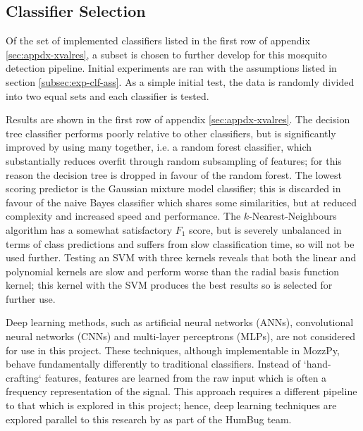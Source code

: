      
    \subsection{Classifier Selection}
    \label{subsec:exp-clf-select}
        Of the set of implemented classifiers listed in the first row of appendix \ref{sec:appdx-xvalres}, a subset is chosen to further develop for this mosquito detection pipeline. Initial experiments are ran with the assumptions listed in section \ref{subsec:exp-clf-ass}. As a simple initial test, the data is randomly divided into two equal sets and each classifier is tested.
        
        Results are shown in the first row of appendix \ref{sec:appdx-xvalres}. The decision tree classifier performs poorly relative to other classifiers, but is significantly improved by using many together, i.e. a random forest classifier, which substantially reduces overfit through random subsampling of features; for this reason the decision tree is dropped in favour of the random forest. The lowest scoring predictor is the Gaussian mixture model classifier; this is discarded in favour of the naive Bayes classifier which shares some similarities, but at reduced complexity and increased speed and performance. The $k$-Nearest-Neighbours algorithm has a somewhat satisfactory $F_1$ score, but is severely unbalanced in terms of class predictions and suffers from slow classification time, so will not be used further. Testing an SVM with three kernels reveals that both the linear and polynomial kernels are slow and perform worse than the radial basis function kernel; this kernel with the SVM produces the best results so is selected for further use.

        Deep learning methods, such as artificial neural networks (ANNs), convolutional neural networks (CNNs) and multi-layer perceptrons (MLPs), are not considered for use in this project. These techniques, although implementable in MozzPy, behave fundamentally differently to traditional classifiers. Instead of `hand-crafting` features, features are learned from the raw input which is often a frequency representation of the signal. This approach requires a different pipeline to that which is explored in this project; hence, deep learning techniques are explored parallel to this research by \textcite{Kiskin} as part of the HumBug team.
        
        
        
